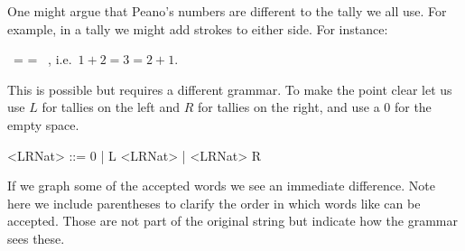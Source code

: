 One might argue that Peano's numbers are different to the tally we all use.  For example, in a tally we might 
add strokes to either side.  For instance:
\begin{center}
    \StrokeOne~\StrokeTwo = \StrokeThree = \StrokeTwo~\StrokeOne,
    i.e.\ $1+2=3=2+1$.
\end{center}
This is possible but requires a different grammar.  To make the point clear let us 
use $L$ for tallies on the left and $R$ for tallies on the right, and use a $0$ for 
the empty space.
\begin{center}
\begin{gcode}[]
<LRNat> ::= 0
         | L <LRNat>
         | <LRNat> R
\end{gcode}
\end{center}
If we graph some of the accepted words we see an immediate difference.
Note here we include parentheses to clarify the order in which 
words like  can be accepted.  Those are not part of the 
original string but indicate how the grammar sees these.
